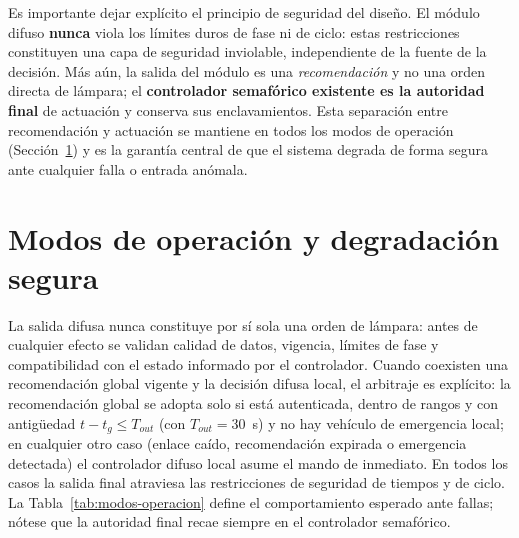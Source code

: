 Es importante dejar explícito el principio de seguridad del diseño. El módulo difuso
\textbf{nunca} viola los límites duros de fase ni de ciclo: estas restricciones constituyen una
capa de seguridad inviolable, independiente de la fuente de la decisión. Más aún, la salida del
módulo es una \emph{recomendación} y no una orden directa de lámpara; el \textbf{controlador
semafórico existente es la autoridad final} de actuación y conserva sus enclavamientos. Esta
separación entre recomendación y actuación se mantiene en todos los modos de operación
(Sección~\ref{sec:modos-operacion}) y es la garantía central de que el sistema degrada de forma
segura ante cualquier falla o entrada anómala.

\section{Modos de operación y degradación segura}\label{sec:modos-operacion}

La salida difusa nunca constituye por sí sola una orden de lámpara: antes de cualquier efecto
se validan calidad de datos, vigencia, límites de fase y compatibilidad con el estado informado
por el controlador. Cuando coexisten una recomendación global vigente y la decisión difusa
local, el arbitraje es explícito: la recomendación global se adopta solo si está autenticada,
dentro de rangos y con antigüedad $t-t_{g}\le T_{out}$ (con $T_{out}=30$~s) y no hay vehículo de
emergencia local; en cualquier otro caso (enlace caído, recomendación expirada o emergencia
detectada) el controlador difuso local asume el mando de inmediato. En todos los casos la salida
final atraviesa las restricciones de seguridad de tiempos y de ciclo. La
Tabla~\ref{tab:modos-operacion} define el comportamiento esperado ante fallas; nótese que la
autoridad final recae siempre en el controlador semafórico.
\newpage

